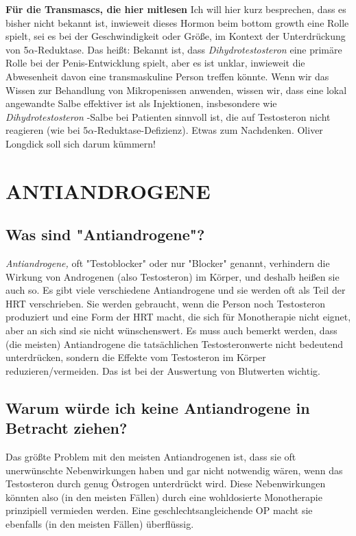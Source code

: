 \documentclass{article}
\begin{document}
\textbf{Für die Transmascs, die hier mitlesen} Ich will hier kurz besprechen, dass es bisher nicht bekannt ist, inwieweit dieses Hormon beim bottom growth eine Rolle spielt, sei es bei der Geschwindigkeit oder Größe, im Kontext der Unterdrückung von 5$\alpha$-Reduktase. Das heißt: Bekannt ist, dass \textit{Dihydrotestosteron }eine primäre Rolle bei der Penis-Entwicklung spielt, aber es ist unklar, inwieweit die Abwesenheit davon eine transmaskuline Person treffen könnte. Wenn wir das Wissen zur Behandlung von Mikropenissen anwenden, wissen wir, dass eine lokal angewandte Salbe effektiver ist als Injektionen, insbesondere wie \textit{Dihydrotestosteron }-Salbe bei Patienten sinnvoll ist, die auf Testosteron nicht reagieren (wie bei 5$\alpha$-Reduktase-Defizienz). Etwas zum Nachdenken. Oliver Longdick soll sich darum kümmern!

 

\section{ANTIANDROGENE}\label{AA}

\subsection{Was sind "Antiandrogene"?}

\textit{Antiandrogene, }oft "Testoblocker" oder nur "Blocker" genannt, verhindern die Wirkung von Androgenen (also Testosteron) im Körper, und deshalb heißen sie auch so. Es gibt viele verschiedene Antiandrogene und sie werden oft als Teil der HRT verschrieben. Sie werden gebraucht, wenn die Person noch Testosteron produziert und eine Form der HRT macht, die sich für Monotherapie nicht eignet, aber an sich sind sie nicht wünschenswert. Es muss auch bemerkt werden, dass (die meisten) Antiandrogene die tatsächlichen Testosteronwerte nicht bedeutend unterdrücken, sondern die Effekte vom Testosteron im Körper reduzieren/vermeiden. Das ist bei der Auswertung von Blutwerten wichtig.

\subsection{Warum würde ich keine Antiandrogene in Betracht ziehen?}

Das größte Problem mit den meisten Antiandrogenen ist, dass sie oft unerwünschte Nebenwirkungen haben und gar nicht notwendig wären, wenn das Testosteron durch genug Östrogen unterdrückt wird. Diese Nebenwirkungen könnten also (in den meisten Fällen) durch eine wohldosierte Monotherapie prinzipiell vermieden werden. Eine geschlechtsangleichende OP macht sie ebenfalls (in den meisten Fällen) überflüssig.
\end{document}
